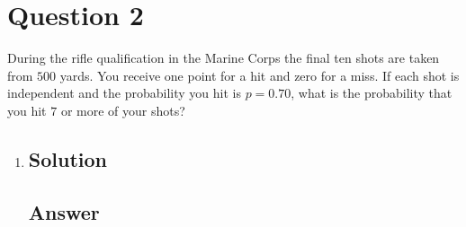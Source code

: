 \documentclass[12pt]{article}
\begin{document}
	
	\section*{Question 2}
	
	\noindent During the rifle qualification in the Marine Corps the final ten shots are taken from $500$ yards. You receive one point for a hit and zero for a miss. If each shot is independent and the probability you hit is $p = 0.70$, what is the probability that you hit $7$ or more of your shots?
	
	\bigskip
	
	\begin{enumerate}[label={},leftmargin=0in]\item
		\subsection*{Solution}
		
		\subsection*{Answer}
		
			\[\boxed{}\]
	\end{enumerate}
	
\end{document}
